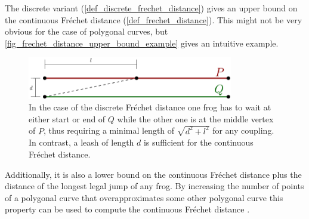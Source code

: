 \documentclass[
oneside,
fontsize=11pt
]{scrartcl}
\begin{document}
The discrete variant (\autoref{def_discrete_frechet_distance}) gives an upper bound on the continuous Fréchet distance (\autoref{def_frechet_distance}). 
This might not be very obvious for the case of polygonal curves, 
but \autoref{fig_frechet_distance_upper_bound_example} gives an intuitive example.

\begin{figure}[ht]
  \centering
  \includegraphics[width=0.8\textwidth]{images/frechet_distance/discrete-frechet-distance-upper-bound.pdf}
  \caption[Upper bound on Fréchet distance]{
    In the case of the discrete Fréchet distance 
    one frog has to wait at either start or end of $Q$
    while the other one is at the middle vertex of $P$, 
    thus requiring a minimal length of $\sqrt{d^2 + l^2}$ for any coupling.
    In contrast, a leash of length $d$ is sufficient for the continuous Fréchet distance.}
  \label{fig_frechet_distance_upper_bound_example}
\end{figure}




Additionally, it is also a lower bound on the continuous Fréchet distance 
plus the distance of the longest legal jump of any frog. 
By increasing the number of points of a polygonal curve that 
overapproximates some other polygonal curve
this property can be used to compute the continuous Fréchet distance \cite{eiter_computing_1994}.





\end{document}
